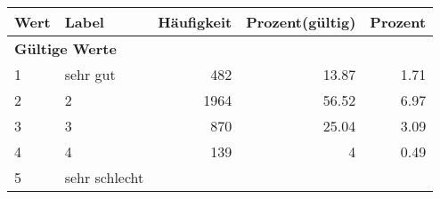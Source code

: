     \begin{longtable}{lXrrr}
     \toprule
     \textbf{Wert} & \textbf{Label} & \textbf{Häufigkeit} & \textbf{Prozent(gültig)} & \textbf{Prozent} \\
     \endhead
     \midrule
     \multicolumn{5}{l}{\textbf{Gültige Werte}}\\

     1 &
     \multicolumn{1}{X}{ sehr gut   } &


       \num{482} &
       \num[round-mode=places,round-precision=2]{13.87} &
         \num[round-mode=places,round-precision=2]{1.71} \\

     2 &
     \multicolumn{1}{X}{ 2   } &


       \num{1964} &
       \num[round-mode=places,round-precision=2]{56.52} &
         \num[round-mode=places,round-precision=2]{6.97} \\

     3 &
     \multicolumn{1}{X}{ 3   } &


       \num{870} &
       \num[round-mode=places,round-precision=2]{25.04} &
         \num[round-mode=places,round-precision=2]{3.09} \\

     4 &
     \multicolumn{1}{X}{ 4   } &


       \num{139} &
       \num[round-mode=places,round-precision=2]{4} &
         \num[round-mode=places,round-precision=2]{0.49} \\

     5 &
     \multicolumn{1}{X}{ sehr schlecht   } &



\end{longtable}
